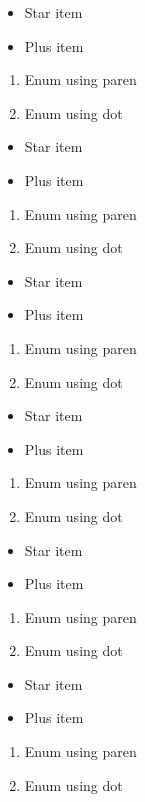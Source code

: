 \begin{itemize}
\item Star item
\item Plus item
\end{itemize}

\begin{enumerate}
\item Enum using paren
\item Enum using dot
\end{enumerate}
\begin{itemize}
\item Star item
\item Plus item
\end{itemize}

\begin{enumerate}
\item Enum using paren
\item Enum using dot
\end{enumerate}
\begin{itemize}
\item Star item
\item Plus item
\end{itemize}

\begin{enumerate}
\item Enum using paren
\item Enum using dot
\end{enumerate}
\begin{frame}[t]
\begin{itemize}
\item Star item
\item Plus item
\end{itemize}

\begin{enumerate}
\item Enum using paren
\item Enum using dot
\end{enumerate}
\end{frame}

\begin{frame}[t]
\begin{itemize}
\item Star item
\item Plus item
\end{itemize}

\begin{enumerate}
\item Enum using paren
\item Enum using dot
\end{enumerate}
\end{frame}

\begin{frame}[t]
\begin{itemize}
\item Star item
\item Plus item
\end{itemize}

\begin{enumerate}
\item Enum using paren
\item Enum using dot
\end{enumerate}
\end{frame}

